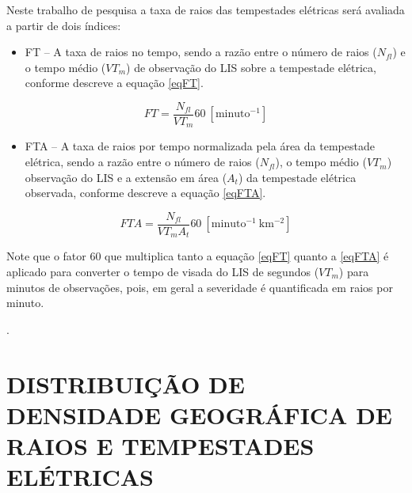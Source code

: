 Neste trabalho de pesquisa a taxa de raios das tempestades elétricas será avaliada a partir de dois índices:

\begin{itemize}
\item FT -- A taxa de raios no tempo, sendo a razão entre o número de raios ($N_{fl}$) e o tempo médio ($VT_m$) de observação do LIS sobre a tempestade elétrica, conforme descreve a equação \ref{eqFT}.
\end{itemize}

\begin{equation}
FT = \frac{N_{fl} }{VT_m} 60 ~[\mathrm{minuto^{-1}}]  
\label{eqFT}  
\end{equation}

\begin{itemize}
\item FTA -- A taxa de raios por tempo normalizada pela área da tempestade elétrica, sendo a razão entre o número de raios ($N_{fl}$), o tempo médio ($VT_m$) observação do LIS e a extensão em área ($A_t$) da tempestade elétrica observada, conforme descreve a equação \ref{eqFTA}.
\end{itemize}

\begin{equation}
FTA = \frac{N_{fl} }{VT_m A_t } 60 ~[\mathrm{minuto^{-1}~km^{-2}}]
\label{eqFTA}
\end{equation}


Note que o fator 60 que multiplica tanto a equação \ref{eqFT} quanto a \ref{eqFTA} é aplicado para converter o tempo de visada do LIS de segundos ($VT_m$) para minutos de observações, pois, em geral a severidade é quantificada em raios por minuto.


 .


\section{DISTRIBUIÇÃO DE DENSIDADE GEOGRÁFICA DE RAIOS E TEMPESTADES ELÉTRICAS}
\label{metodoPass}


